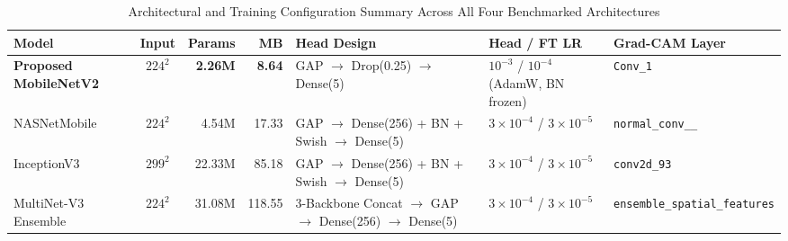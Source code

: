 \begin{table}[htbp]
\caption{Architectural and Training Configuration Summary Across All Four Benchmarked Architectures}
\label{tab:arch_specs}
\begin{center}
\small
\setlength{\tabcolsep}{3.5pt}
\begin{tabularx}{\textwidth}{| L{2.6cm} | c | r | r | X | L{2.1cm} | L{1.9cm} |}
\hline
\textbf{Model} & \textbf{Input} & \textbf{Params} & \textbf{MB} & \textbf{Head Design} & \textbf{Head / FT LR} & \textbf{Grad-CAM Layer} \\
\hline
\textbf{Proposed MobileNetV2} & $224^2$ & \textbf{2.26M} & \textbf{8.64} & GAP $\rightarrow$ Drop(0.25) $\rightarrow$ Dense(5) & $10^{-3}$ / $10^{-4}$ (AdamW, BN frozen) & \texttt{Conv\_1} \\
\hline
NASNetMobile & $224^2$ & 4.54M & 17.33 & GAP $\rightarrow$ Dense(256) + BN + Swish $\rightarrow$ Dense(5) & $3\!\times\!10^{-4}$ / $3\!\times\!10^{-5}$ & \texttt{normal\_\allowbreak conv\_\_} \\
\hline
InceptionV3 & $299^2$ & 22.33M & 85.18 & GAP $\rightarrow$ Dense(256) + BN + Swish $\rightarrow$ Dense(5) & $3\!\times\!10^{-4}$ / $3\!\times\!10^{-5}$ & \texttt{conv2d\_93} \\
\hline
MultiNet-V3 Ensemble & $224^2$ & 31.08M & 118.55 & 3-Backbone Concat $\rightarrow$ GAP $\rightarrow$ Dense(256) $\rightarrow$ Dense(5) & $3\!\times\!10^{-4}$ / $3\!\times\!10^{-5}$ & \texttt{ensemble\_\allowbreak spatial\_\allowbreak features} \\
\hline
\end{tabularx}
\end{center}
\end{table}

